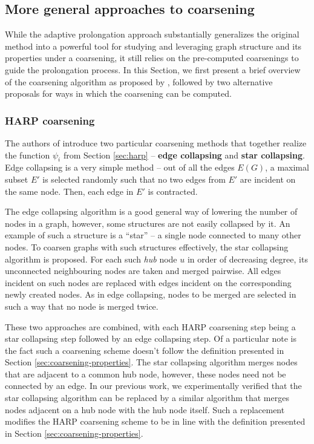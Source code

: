 \subsection{More general approaches to coarsening}\label{sec:coarsening-algorithms}

While the adaptive prolongation approach substantially generalizes the original method into a powerful tool for studying and leveraging graph structure and its properties under a coarsening, it still relies on the pre-computed coarsenings to guide the prolongation process. In this Section, we first present a brief overview of the coarsening algorithm as proposed by \cite{chen_harp_2018}, followed by two alternative proposals for ways in which the coarsening can be computed.

\subsubsection{HARP coarsening}\label{sec:harp-coarsening}

The authors of \cite{chen_harp_2018} introduce two particular coarsening methods that together realize the function \( \psi_i \) from Section \ref{sec:harp} -- \textbf{edge collapsing} and \textbf{star collapsing}. Edge collapsing is a very simple method -- out of all the edges \( E \left( G \right) \), a maximal subset \( E' \) is selected randomly such that no two edges from \( E' \) are incident on the same node. Then, each edge in \( E' \) is contracted.

The edge collapsing algorithm is a good general way of lowering the number of nodes in a graph, however, some structures are not easily collapsed by it. An example of such a structure is a \enquote{star} -- a single node connected to many other nodes. To coarsen graphs with such structures effectively, the star collapsing algorithm is proposed. For each such \textit{hub} node \( u \) in order of decreasing degree, its unconnected neighbouring nodes are taken and merged pairwise. All edges incident on such nodes are replaced with edges incident on the corresponding newly created nodes. As in edge collapsing, nodes to be merged are selected in such a way that no node is merged twice.

These two approaches are combined, with each HARP coarsening step being a star collapsing step followed by an edge collapsing step. Of a particular note is the fact such a coarsening scheme doesn't follow the definition presented in Section \ref{sec:coarsening-properties}. The star collapsing algorithm merges nodes that are adjacent to a common hub node, however, these nodes need not be connected by an edge. In our previous work, we experimentally verified that the star collapsing algorithm can be replaced by a similar algorithm that merges nodes adjacent on a hub node with the hub node itself. Such a replacement modifies the HARP coarsening scheme to be in line with the definition presented in Section \ref{sec:coarsening-properties}.

